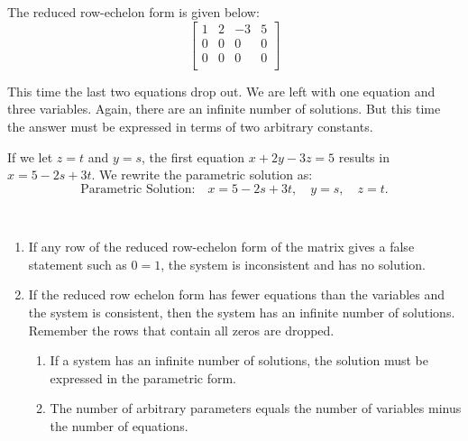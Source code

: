 \begin{solution}
    The reduced row-echelon form is given below:
    \[
        \left[
            \begin{array}{ccc|c}
                1 & 2 & -3 & 5 \\
                0 & 0 & 0  & 0 \\
                0 & 0 & 0  & 0 \\
            \end{array}
            \right]
    \]

    This time the last two equations drop out. We are left with one equation and three variables. Again, there are an infinite number of solutions. But this time the answer must be expressed in terms of two arbitrary constants.

    If we let \( z = t \) and \( y = s \), the first equation \( x + 2y - 3z = 5 \) results in \( x = 5 - 2s + 3t \). We rewrite the parametric solution as:
    \[ \text{Parametric Solution:} \quad x = 5 - 2s + 3t, \quad y = s, \quad z = t. \]
\end{solution}

\begin{summarybox}
    ~\\
    \begin{enumerate}
        \item If any row of the reduced row-echelon form of the matrix gives a false statement such as \( 0 = 1 \), the system is inconsistent and has no solution.
        \item If the reduced row echelon form has fewer equations than the variables and the system is consistent, then the system has an infinite number of solutions. Remember the rows that contain all zeros are dropped.
              \begin{enumerate}
                  \item If a system has an infinite number of solutions, the solution must be expressed in the parametric form.
                  \item The number of arbitrary parameters equals the number of variables minus the number of equations.
              \end{enumerate}
    \end{enumerate}
\end{summarybox}